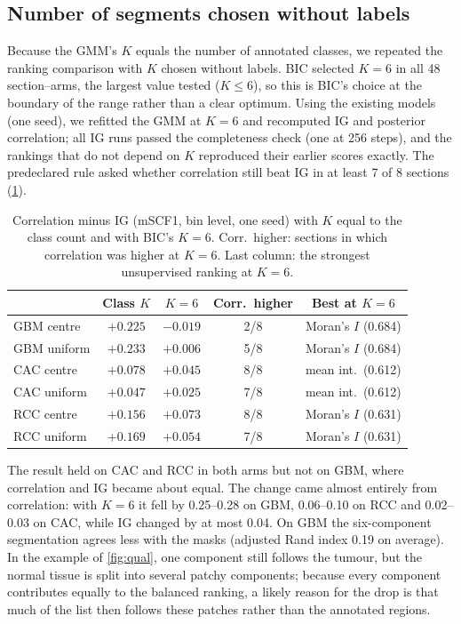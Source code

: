 \subsection{Number of segments chosen without labels}
\label{sec:res-lfk}
Because the GMM's $K$ equals the number of annotated classes, we repeated the
ranking comparison with $K$ chosen without labels. BIC selected $K=6$ in all 48
section--arms, the largest value tested ($K\le6$), so this is BIC's choice at
the boundary of the range rather than a clear optimum. Using the existing
models (one seed), we refitted the GMM at $K=6$ and recomputed IG and posterior
correlation; all IG runs passed the completeness check (one at 256 steps), and
the rankings that do not depend on $K$ reproduced their earlier scores exactly.
The predeclared rule asked whether correlation still beat IG in at least 7 of
8 sections (\cref{tab:lfk}).

\begin{table}[t]
\caption{Correlation minus IG (mSCF1, bin level, one seed) with $K$ equal to
the class count and with BIC's $K=6$. Corr.\ higher: sections in which
correlation was higher at $K=6$. Last column: the strongest unsupervised ranking at $K=6$.}
\label{tab:lfk}
\centering\scriptsize
\setlength{\tabcolsep}{3pt}
\begin{tabular}{@{}lcccc@{}}
\toprule
 & Class $K$ & $K=6$ & Corr.\ higher & Best at $K=6$ \\
\midrule
GBM centre & $+0.225$ & $-0.019$ & 2/8 & Moran's $I$ (0.684) \\
GBM uniform & $+0.233$ & $+0.006$ & 5/8 & Moran's $I$ (0.684) \\
CAC centre & $+0.078$ & $+0.045$ & 8/8 & mean int.\ (0.612) \\
CAC uniform & $+0.047$ & $+0.025$ & 7/8 & mean int.\ (0.612) \\
RCC centre & $+0.156$ & $+0.073$ & 8/8 & Moran's $I$ (0.631) \\
RCC uniform & $+0.169$ & $+0.054$ & 7/8 & Moran's $I$ (0.631) \\
\bottomrule
\end{tabular}
\end{table}

The result held on CAC and RCC in both arms but not on GBM, where correlation
and IG became about equal. The change came almost entirely from correlation:
with $K=6$ it fell by 0.25--0.28 on GBM, 0.06--0.10 on RCC and 0.02--0.03 on
CAC, while IG changed by at most 0.04. On GBM the six-component segmentation
agrees less with the masks (adjusted Rand index 0.19 on average). In the
example of \cref{fig:qual}, one component still follows the tumour, but the
normal tissue is split into several patchy components; because every component
contributes equally to the balanced ranking, a likely reason for the drop is
that much of the list then follows these patches rather than the annotated
regions.

